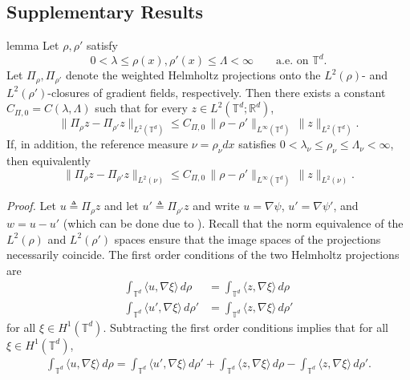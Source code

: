 \documentclass[11pt]{article}
\begin{document}
\subsection{Supplementary Results} \label{sec: stability thm supplemental results}

\begin{restatable}{lemma}{} \label{L2 lipschitz stability}
    Let
    $\rho,\rho'$ satisfy
    \[
    0<\lambda\le \rho(x),\rho'(x)\le \Lambda<\infty
    \qquad\text{a.e. on }\mathbb{T}^d.
    \]
    Let $\Pi_\rho,\Pi_{\rho'}$ denote the weighted Helmholtz projections onto the
    $L^2(\rho)$- and $L^2(\rho')$-closures of gradient fields, respectively.
    Then there exists a constant $C_{\Pi, 0}=C(\lambda,\Lambda)$ such that for every
    $z\in L^2(\mathbb{T}^d;\mathbb R^d)$,
    \[
    \|\Pi_\rho z-\Pi_{\rho'} z\|_{L^2(\mathbb{T}^d)}
    \le
    C_{\Pi, 0}\,\|\rho-\rho'\|_{L^\infty(\mathbb{T}^d)}\,\|z\|_{L^2(\mathbb{T}^d)}.
    \]
    If, in addition, the reference measure $\nu=\rho_\nu dx$ satisfies
    $0<\lambda_\nu\le \rho_\nu\le \Lambda_\nu<\infty$, then equivalently
    \[
    \|\Pi_\rho z-\Pi_{\rho'} z\|_{L^2(\nu)}
    \le
    C_{\Pi, 0}\,\|\rho-\rho'\|_{L^\infty(\mathbb{T}^d)}\,\|z\|_{L^2(\nu)}.
    \]
\end{restatable}
\noindent \textit{Proof.} Let $u \triangleq \Pi_\rho z$ and let $u' \triangleq \Pi_{\rho'}z$ and write $u = \nabla \psi$, $u' = \nabla \psi'$, and $w = u - u'$ (which can be done due to ). Recall that the norm equivalence of the $L^2(\rho)$ and $L^2(\rho')$ spaces ensure that the image spaces of the projections necessarily coincide. The first order conditions of the two Helmholtz projections are
\begin{align*}
    \int_{\mathbb{T}^d} \langle u, \nabla \xi\rangle\, d\rho &= \int_{\mathbb{T}^d} \langle z, \nabla\xi \rangle \, d\rho  \\
    \int_{\mathbb{T}^d} \langle u', \nabla \xi\rangle\, d\rho' &= \int_{\mathbb{T}^d} \langle z, \nabla\xi \rangle \, d\rho'
\end{align*}
for all $\xi \in H^1(\mathbb{T}^d).$ Subtracting the first order conditions implies that for all $\xi \in H^1(\mathbb{T}^d)$,
\begin{align*}
    \int_{\mathbb{T}^d} \langle u, \nabla \xi\rangle\, d\rho =   \int_{\mathbb{T}^d} \langle u', \nabla \xi\rangle\, d\rho'+\int_{\mathbb{T}^d} \langle z, \nabla\xi \rangle \, d\rho - \int_{\mathbb{T}^d} \langle z, \nabla\xi \rangle \, d\rho'.
\end{align*}
\end{document}
